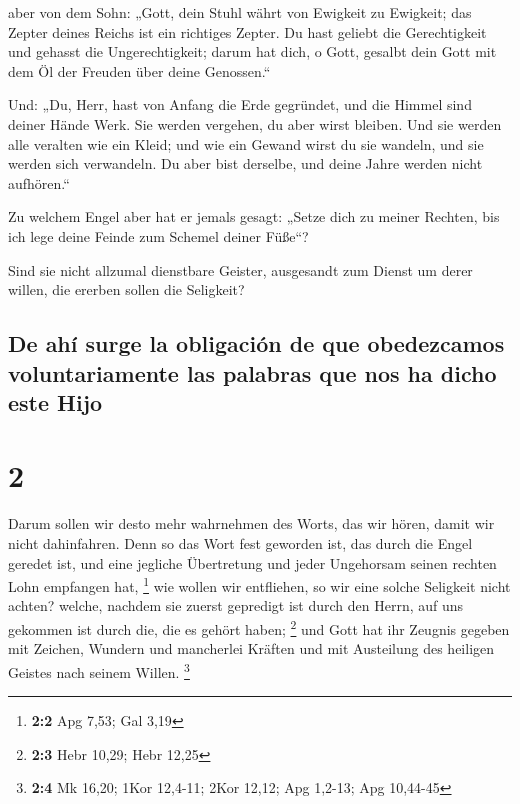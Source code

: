  aber von dem Sohn: „Gott, dein Stuhl währt von Ewigkeit
zu Ewigkeit; das Zepter deines Reichs ist ein richtiges Zepter.
 Du hast geliebt die Gerechtigkeit und gehasst die
Ungerechtigkeit; darum hat dich, o Gott, gesalbt dein Gott mit dem Öl
der Freuden über deine Genossen.``

 Und: „Du, Herr, hast von Anfang die Erde gegründet, und
die Himmel sind deiner Hände Werk.  Sie werden vergehen,
du aber wirst bleiben. Und sie werden alle veralten wie ein Kleid;
 und wie ein Gewand wirst du sie wandeln, und sie werden
sich verwandeln. Du aber bist derselbe, und deine Jahre werden nicht
aufhören.``

 Zu welchem Engel aber hat er jemals gesagt: „Setze dich
zu meiner Rechten, bis ich lege deine Feinde zum Schemel deiner Füße``?

 Sind sie nicht allzumal dienstbare Geister, ausgesandt
zum Dienst um derer willen, die ererben sollen die Seligkeit?

\hypertarget{de-ahuxed-surge-la-obligaciuxf3n-de-que-obedezcamos-voluntariamente-las-palabras-que-nos-ha-dicho-este-hijo}{%
\subsection{De ahí surge la obligación de que obedezcamos
voluntariamente las palabras que nos ha dicho este
Hijo}\label{de-ahuxed-surge-la-obligaciuxf3n-de-que-obedezcamos-voluntariamente-las-palabras-que-nos-ha-dicho-este-hijo}}

\hypertarget{section-1}{%
\section{2}\label{section-1}}

 Darum sollen wir desto mehr wahrnehmen des Worts, das wir
hören, damit wir nicht dahinfahren.  Denn so das Wort fest
geworden ist, das durch die Engel geredet ist, und eine jegliche
Übertretung und jeder Ungehorsam seinen rechten Lohn empfangen hat,
\footnote{\textbf{2:2} Apg 7,53; Gal 3,19}  wie wollen wir
entfliehen, so wir eine solche Seligkeit nicht achten? welche, nachdem
sie zuerst gepredigt ist durch den Herrn, auf uns gekommen ist durch
die, die es gehört haben; \footnote{\textbf{2:3} Hebr 10,29; Hebr 12,25}
 und Gott hat ihr Zeugnis gegeben mit Zeichen, Wundern und
mancherlei Kräften und mit Austeilung des heiligen Geistes nach seinem
Willen. \footnote{\textbf{2:4} Mk 16,20; 1Kor 12,4-11; 2Kor 12,12; Apg
  1,2-13; Apg 10,44-45}

